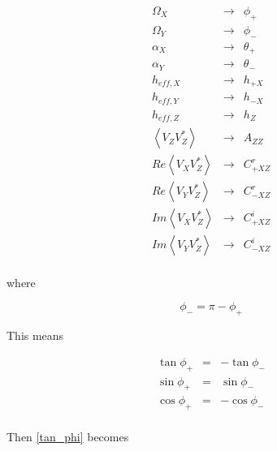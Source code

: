\documentclass[a4paper,10pt]{thesis}
\begin{document}
\begin{eqnarray}
  \Omega_X &\rightarrow& \phi_+ \\
\Omega_Y &\rightarrow& \phi_- \\
\alpha_X &\rightarrow& \theta_+ \\
\alpha_Y &\rightarrow& \theta_-\\
h_{eff,X} &\rightarrow& h_{+X} \\
h_{eff,Y} &\rightarrow& h_{-X}\\
h_{eff,Z} &\rightarrow& h_{Z}\\
\left\langle V_Z V_Z^{*} \right\rangle &\rightarrow& A_{ZZ}\\
Re \left\langle V_X V_Z^{*} \right\rangle &\rightarrow& C_{+XZ}^r\\
Re \left\langle V_Y V_Z^{*}\right\rangle &\rightarrow& C_{-XZ}^r\\
Im \left\langle V_X V_Z^{*} \right\rangle &\rightarrow& C_{+XZ}^i\\
Im \left\langle V_Y V_Z^{*}\right\rangle &\rightarrow& C_{-XZ}^i
\end{eqnarray}


\paragraph*{}
where

\begin{equation}
    \phi_-=\pi -\phi_+
\end{equation}

This means

\begin{eqnarray}
 \tan \phi_+ &=& - \tan \phi_- \\
 \sin \phi_+ &=&  \sin \phi_- \\
 \cos \phi_+ &=& - \cos \phi_-
\end{eqnarray}

\paragraph*{}
Then \ref{tan_phi} becomes
\end{document}
